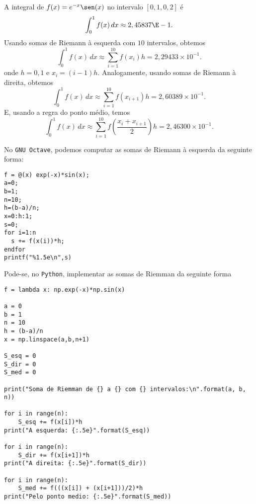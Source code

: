 \begin{ex}
  A integral de $f(x) = e^{-x}\sen(x)$ no intervalo $[0,1, 0,2]$ é
  \begin{equation}
    \int_{0}^{1} f(x)\,dx \approx 2,45837\E-1.
  \end{equation}
Usando somas de Riemann à esquerda com $10$ intervalos, obtemos
\begin{equation}
  \int_0^1 f(x)\,dx \approx \sum_{i=1}^{10} f(x_{i})h = 2,29433\times 10^{-1}.
\end{equation}
onde $h=0,1$ e $x_i=(i-1)h$. Analogamente, usando somas de Riemann à direita, obtemos
\begin{equation}
  \int_0^1 f(x)\,dx \approx \sum_{i=1}^{10} f(x_{i+1})h = 2,60389\times 10^{-1}.
\end{equation}
E, usando a regra do ponto médio, temos
\begin{equation}
  \int_0^1 f(x)\,dx \approx \sum_{i=1}^{10} f\left(\frac{x_i+x_{i+1}}{2}\right)h = 2,46300\times 10^{-1}.
\end{equation}

\ifisscilab
\construirScilab
\fi
\ifisoctave
No \verb+GNU Octave+, podemos computar as somas de Riemann à esquerda da seguinte forma:
\begin{verbatim}
f = @(x) exp(-x)*sin(x);
a=0;
b=1;
n=10;
h=(b-a)/n;
x=0:h:1;
s=0;
for i=1:n
  s += f(x(i))*h;
endfor
printf("%1.5e\n",s)
\end{verbatim}
\fi
\ifispython
Pode-se, no \verb+Python+, implementar as somas de Riemman da seguinte forma
\begin{verbatim}
f = lambda x: np.exp(-x)*np.sin(x)

a = 0
b = 1
n = 10
h = (b-a)/n
x = np.linspace(a,b,n+1)

S_esq = 0
S_dir = 0
S_med = 0

print("Soma de Riemman de {} a {} com {} intervalos:\n".format(a, b, n))

for i in range(n):
    S_esq += f(x[i])*h
print("A esquerda: {:.5e}".format(S_esq))

for i in range(n):
    S_dir += f(x[i+1])*h
print("A direita: {:.5e}".format(S_dir))

for i in range(n):
    S_med += f(((x[i]) + (x[i+1]))/2)*h
print("Pelo ponto medio: {:.5e}".format(S_med))
\end{verbatim}
\fi
\end{ex}


